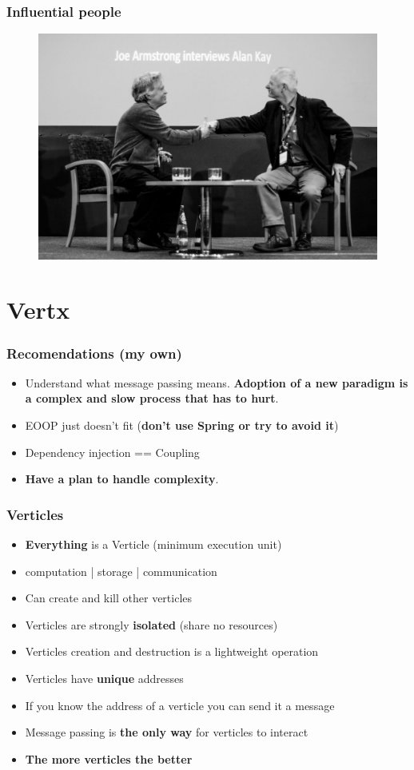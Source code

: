 \documentclass{beamer}
\begin{document}
\begin{frame}
\frametitle{Influential people}
\begin{figure}
\includegraphics[scale=0.25]{images/joe_and_alan.jpg}
\end{figure}
\end{frame} 

\section{Vertx}

\begin{frame}
\frametitle{Recomendations (my own)}
\begin{itemize}
\item<1-> Understand what message passing means. \textbf{Adoption of a new paradigm is a complex and slow process that has to hurt}.
\item<2-> EOOP just doesn't fit (\textbf{don't use Spring or try to avoid it})
\item <3->Dependency injection == Coupling
\item<4-> \textbf{Have a plan to handle complexity}.
\end{itemize}
\end{frame} 


\begin{frame}
\frametitle{Verticles}
\begin{itemize}
 \item<1-> \textbf{Everything} is a Verticle (minimum execution unit)
 \item<2-> computation | storage | communication
 \item<3-> Can create and kill other verticles
 \item<4-> Verticles are strongly \textbf{isolated} (share no resources)
 \item<5-> Verticles creation and destruction is a lightweight operation
 \item<6-> Verticles have \textbf{unique} addresses
 \item<7-> If you know the address  of a verticle you can send it a message
 \item<8-> Message passing is \textbf{the only way} for verticles to interact
 \item<9-> \textbf{The more verticles the better}
\end{itemize}
\end{frame}
\end{document}
